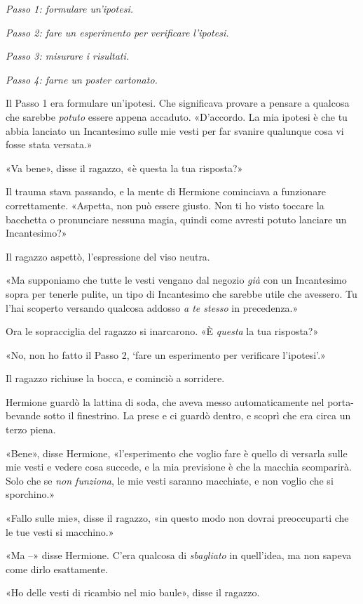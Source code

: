 \textit{Passo 1: formulare un’ipotesi.}

\textit{Passo 2: fare un esperimento per verificare l’ipotesi.}

\textit{Passo 3: misurare i risultati.}

\textit{Passo 4: farne un poster cartonato.}

Il Passo 1 era formulare un’ipotesi. Che significava provare a pensare a qualcosa che sarebbe \textit{potuto} essere appena accaduto. «D’accordo. La mia ipotesi è che tu abbia lanciato un Incantesimo sulle mie vesti per far svanire qualunque cosa vi fosse stata versata.»

«Va bene», disse il ragazzo, «è questa la tua risposta?»

Il trauma stava passando, e la mente di Hermione cominciava a funzionare correttamente. «Aspetta, non può essere giusto. Non ti ho visto toccare la bacchetta o pronunciare nessuna magia, quindi come avresti potuto lanciare un Incantesimo?»

Il ragazzo aspettò, l’espressione del viso neutra.

«Ma supponiamo che tutte le vesti vengano dal negozio \textit{già} con un Incantesimo sopra per tenerle pulite, un tipo di Incantesimo che sarebbe utile che avessero. Tu l’hai scoperto versando qualcosa addosso \textit{a te stesso} in precedenza.»

Ora le sopracciglia del ragazzo si inarcarono. «È \textit{questa} la tua risposta?»

«No, non ho fatto il Passo 2, ‘fare un esperimento per verificare l’ipotesi’.»

Il ragazzo richiuse la bocca, e cominciò a sorridere.

Hermione guardò la lattina di soda, che aveva messo automaticamente nel porta-bevande sotto il finestrino. La prese e ci guardò dentro, e scoprì che era circa un terzo piena.

«Bene», disse Hermione, «l’esperimento che voglio fare è quello di versarla sulle mie vesti e vedere cosa succede, e la mia previsione è che la macchia scomparirà. Solo che se \textit{non funziona}, le mie vesti saranno macchiate, e non voglio che si sporchino.»

«Fallo sulle mie», disse il ragazzo, «in questo modo non dovrai preoccuparti che le tue vesti si macchino.»

«Ma –» disse Hermione. C’era qualcosa di \textit{sbagliato} in quell’idea, ma non sapeva come dirlo esattamente.

«Ho delle vesti di ricambio nel mio baule», disse il ragazzo.

